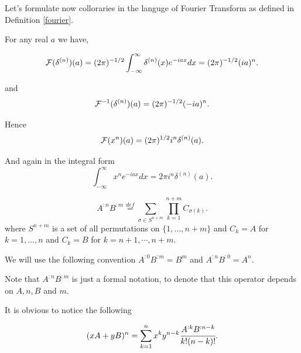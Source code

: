 \documentclass[main.tex]{subfiles}
\begin{document}
Let's formulate now colloraries in the languge of Fourier Transform as defined in Definition \ref{fourier}.

For any real $a$ we have,

\begin{equation}
\mathcal{F}(\delta^{(n)})(a) = (2\pi)^{-1/2} \int_{-\infty}^\infty \delta^{(n)}(x) e^{-iax} dx = 
(2\pi)^{-1/2} (ia)^n.
\end{equation}

and 
\begin{equation}
\mathcal{F}^{-1}(\delta^{(n)})(a) =  (2\pi)^{-1/2} (-ia)^n.
\end{equation}

Hence
\begin{equation}
\mathcal{F}(x^n)(a) = (2\pi)^{1/2}i^n \delta^{(n)}(a).
\end{equation}

And again in the integral form 
\begin{equation}
\label{polinomial-fourier}
\int_{-\infty}^\infty x^n e^{-iax} dx = 2\pi i^n \delta^{(n)}(a).
\end{equation}

\begin{definition}
\begin{equation}
A^{:n} B^{:m} \stackrel{def}{=} \sum_{\sigma\in S^{n + m}} \prod_{k = 1}^{n + m} C_{\sigma(k)}.
\end{equation}
where $S^{n + m}$ is a set of all permutations on $\{1, \dots, n + m\}$ and
$C_k = A$ for $k = 1, \dots, n$ and $C_k = B$ for $k = n + 1, \cdots, n + m$.
\end{definition}

We will use the following convention $A^{:0}B^{:m} = B^m$ and $A^{:n}B^{:0} = A^n$.

Note that $A^{:n} B^{:m}$ is just a formal notation, to denote that this operator depends on $A, n, B$ and $m$.   

It is obvious to notice the following
\begin{lemma}
\begin{equation}
(xA + yB)^n = \sum_{k=1}^n x^k y^{n - k} \cfrac{A^{:k}B^{:n-k}}{k!(n - k)!}.
\end{equation}
\end{lemma}
\end{document}
